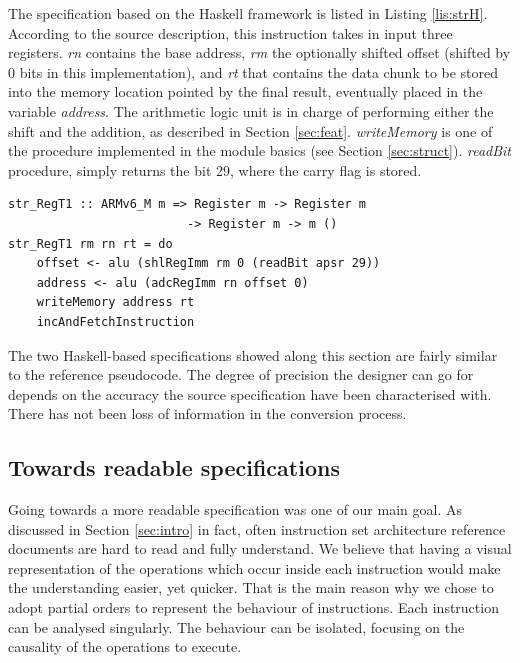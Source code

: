 \documentclass[conference]{IEEEtran}
\begin{document}
\noindent
The specification based on the Haskell framework is listed in Listing \ref{lis:strH}.
According to the source description, this instruction takes in input three registers.
\textit{rn} contains the base address, \textit{rm} the optionally shifted offset (shifted by
0 bits in this implementation), and \textit{rt} that contains the data chunk to be stored
into the memory location pointed by the final result, eventually placed in the variable
\textit{address}. The arithmetic logic unit is in charge of performing either the shift and
the addition, as described in Section \ref{sec:feat}. \textit{writeMemory} is one of the
procedure implemented in the module basics (see Section \ref{sec:struct}). \textit{readBit}
procedure, simply returns the bit 29, where the carry flag is stored.\\

\begin{lstlisting}[caption=STR (register) instruction - Haskell-based specification,
frame=single, label=lis:strH]
str_RegT1 :: ARMv6_M m => Register m -> Register m
						 -> Register m -> m ()
str_RegT1 rm rn rt = do
    offset <- alu (shlRegImm rm 0 (readBit apsr 29))
    address <- alu (adcRegImm rn offset 0)
    writeMemory address rt
    incAndFetchInstruction
\end{lstlisting}

The two Haskell-based specifications showed along this section are fairly similar to the
reference pseudocode. The degree of precision the designer can go for depends on the accuracy
the source specification have been characterised with. There has not been loss of
information in the conversion process.

\subsection{Towards readable specifications}
\label{sec:read}
Going towards a more readable specification was one of our main goal. As discussed in Section
\ref{sec:intro} in fact, often instruction set architecture reference documents are hard to
read and fully understand. We believe that having a visual representation of the operations
which occur inside each instruction would make the understanding easier, yet quicker. That is
the main reason why we chose to adopt partial orders to represent the behaviour of
instructions. Each instruction can be analysed singularly. The behaviour can be isolated,
focusing on the causality of the operations to execute.
\end{document}
